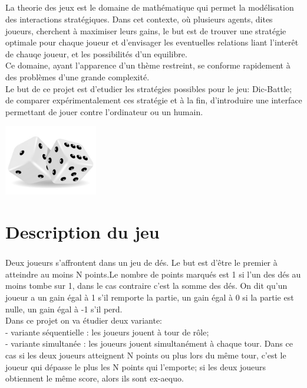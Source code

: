 \documentclass{report}
\begin{document}
  \paragraph{}
  \begin{Large}
  La theorie des jeux est le domaine de mathématique qui permet la modélisation des interactions stratégiques. 
  Dans cet contexte, où plusieurs agents, dites joueurs, cherchent à maximiser leurs gains, le but est de trouver
  une stratégie optimale pour chaque joueur et d'envisager les eventuelles relations liant l'interêt de chauqe 
  joueur, et les possibilités d'un equilibre.\\
  Ce domaine, ayant l'apparence d'un thème restreint, se conforme rapidement à des problèmes d'une grande complexité.\\
  Le but de ce projet est d'etudier les stratégies possibles pour le jeu: Dic-Battle; de comparer expérimentalement ces stratégie
  et à la fin, d'introduire une interface permettant de jouer contre l'ordinateur ou un humain.\\[3.5cm]
  \end{Large}
  \begin{center}
    \includegraphics[width=11em]{de.jpg}\\[30cm]
  \end{center}


  \newpage
  \chapter{Description du jeu}
  \paragraph{}
  \begin{large}
  Deux joueurs s'affrontent dans un jeu de dés. Le but est d'être le premier à atteindre au moins
  N points.Le nombre de points marqués est 1 si l'un des dés au moins tombe sur 1,
  dans le cas contraire c'est la somme des dés. On dit qu'un joueur a un gain égal à 1 s'il remporte la partie, un gain égal
  à 0 si la partie est nulle, un gain égal à -1 s'il perd.\\
  Dans ce projet on va étudier deux variante:\\
  - variante séquentielle : les joueurs jouent à tour de rôle;\\
  - variante simultanée : les joueurs jouent simultanément à chaque tour. Dans ce cas si les
  deux joueurs atteignent N points ou plus lors du même tour, c'est le joueur qui dépasse le
  plus les N points qui l'emporte; si les deux joueurs obtiennent le même score, alors ils sont
  ex-aequo.
  \end{large}
\end{document}

